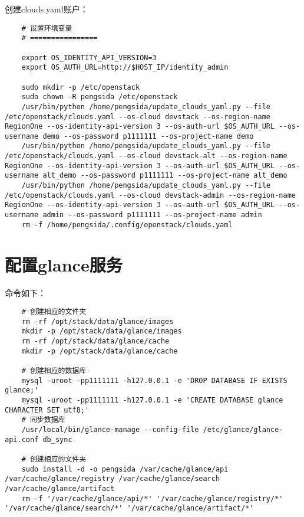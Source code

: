 \documentclass[a4paper,left=1.5cm,right=1.5cm,11pt]{article}
\begin{document}
	创建clouds.yaml账户：
	\begin{lstlisting}
	# 设置环境变量
	# ================

	export OS_IDENTITY_API_VERSION=3
    export OS_AUTH_URL=http://$HOST_IP/identity_admin

	sudo mkdir -p /etc/openstack
	sudo chown -R pengsida /etc/openstack
	/usr/bin/python /home/pengsida/update_clouds_yaml.py --file /etc/openstack/clouds.yaml --os-cloud devstack --os-region-name RegionOne --os-identity-api-version 3 --os-auth-url $OS_AUTH_URL --os-username demo --os-password p1111111 --os-project-name demo
	/usr/bin/python /home/pengsida/update_clouds_yaml.py --file /etc/openstack/clouds.yaml --os-cloud devstack-alt --os-region-name RegionOne --os-identity-api-version 3 --os-auth-url $OS_AUTH_URL --os-username alt_demo --os-password p1111111 --os-project-name alt_demo
	/usr/bin/python /home/pengsida/update_clouds_yaml.py --file /etc/openstack/clouds.yaml --os-cloud devstack-admin --os-region-name RegionOne --os-identity-api-version 3 --os-auth-url $OS_AUTH_URL --os-username admin --os-password p1111111 --os-project-name admin
	rm -f /home/pengsida/.config/openstack/clouds.yaml
	\end{lstlisting}

\section{配置glance服务}
	命令如下：
	\begin{lstlisting}
	# 创建相应的文件夹
	rm -rf /opt/stack/data/glance/images
	mkdir -p /opt/stack/data/glance/images
	rm -rf /opt/stack/data/glance/cache
	mkdir -p /opt/stack/data/glance/cache

	# 创建相应的数据库
	mysql -uroot -pp1111111 -h127.0.0.1 -e 'DROP DATABASE IF EXISTS glance;'
	mysql -uroot -pp1111111 -h127.0.0.1 -e 'CREATE DATABASE glance CHARACTER SET utf8;'
	# 同步数据库
	/usr/local/bin/glance-manage --config-file /etc/glance/glance-api.conf db_sync

	# 创建相应的文件夹
	sudo install -d -o pengsida /var/cache/glance/api /var/cache/glance/registry /var/cache/glance/search /var/cache/glance/artifact
	rm -f '/var/cache/glance/api/*' '/var/cache/glance/registry/*' '/var/cache/glance/search/*' '/var/cache/glance/artifact/*'
	\end{lstlisting}
\end{document}
